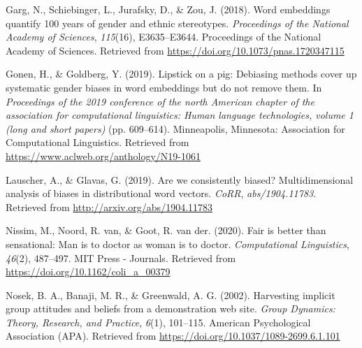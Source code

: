 \documentclass[10pt,dvipsnames,enabledeprecatedfontcommands]{scrartcl}
\begin{document}
\hypertarget{ref-Garg2018years}{}
Garg, N., Schiebinger, L., Jurafsky, D., \& Zou, J. (2018). Word
embeddings quantify 100 years of gender and ethnic stereotypes.
\emph{Proceedings of the National Academy of Sciences}, \emph{115}(16),
E3635--E3644. Proceedings of the National Academy of Sciences. Retrieved
from \url{https://doi.org/10.1073/pnas.1720347115}

\hypertarget{ref-Gonen2019lipstick}{}
Gonen, H., \& Goldberg, Y. (2019). Lipstick on a pig: Debiasing methods
cover up systematic gender biases in word embeddings but do not remove
them. In \emph{Proceedings of the 2019 conference of the north American
chapter of the association for computational linguistics: Human language
technologies, volume 1 (long and short papers)} (pp. 609--614).
Minneapolis, Minnesota: Association for Computational Linguistics.
Retrieved from \url{https://www.aclweb.org/anthology/N19-1061}

\hypertarget{ref-Lauscher2019multidimensional}{}
Lauscher, A., \& Glavas, G. (2019). Are we consistently biased?
Multidimensional analysis of biases in distributional word vectors.
\emph{CoRR}, \emph{abs/1904.11783}. Retrieved from
\url{http://arxiv.org/abs/1904.11783}

\hypertarget{ref-Nissim2020fair}{}
Nissim, M., Noord, R. van, \& Goot, R. van der. (2020). Fair is better
than sensational: Man is to doctor as woman is to doctor.
\emph{Computational Linguistics}, \emph{46}(2), 487--497. MIT Press -
Journals. Retrieved from \url{https://doi.org/10.1162/coli_a_00379}

\hypertarget{ref-Nosek2002harvesting}{}
Nosek, B. A., Banaji, M. R., \& Greenwald, A. G. (2002). Harvesting
implicit group attitudes and beliefs from a demonstration web site.
\emph{Group Dynamics: Theory, Research, and Practice}, \emph{6}(1),
101--115. American Psychological Association (APA). Retrieved from
\url{https://doi.org/10.1037/1089-2699.6.1.101}
\end{document}
